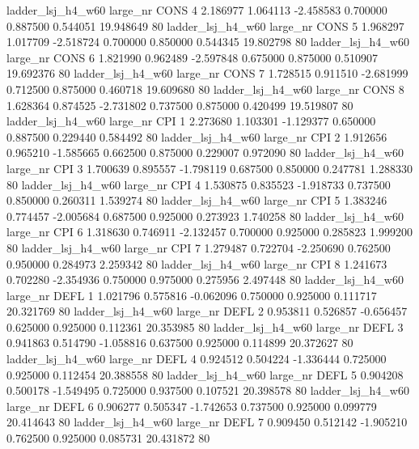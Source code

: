   ladder_lsj_h4_w60   large_nr     CONS                 4  2.186977  1.064113  -2.458583 0.700000 0.887500  0.544051   19.948649 80
  ladder_lsj_h4_w60   large_nr     CONS                 5  1.968297  1.017709  -2.518724 0.700000 0.850000  0.544345   19.802798 80
  ladder_lsj_h4_w60   large_nr     CONS                 6  1.821990  0.962489  -2.597848 0.675000 0.875000  0.510907   19.692376 80
  ladder_lsj_h4_w60   large_nr     CONS                 7  1.728515  0.911510  -2.681999 0.712500 0.875000  0.460718   19.609680 80
  ladder_lsj_h4_w60   large_nr     CONS                 8  1.628364  0.874525  -2.731802 0.737500 0.875000  0.420499   19.519807 80
  ladder_lsj_h4_w60   large_nr      CPI                 1  2.273680  1.103301  -1.129377 0.650000 0.887500  0.229440    0.584492 80
  ladder_lsj_h4_w60   large_nr      CPI                 2  1.912656  0.965210  -1.585665 0.662500 0.875000  0.229007    0.972090 80
  ladder_lsj_h4_w60   large_nr      CPI                 3  1.700639  0.895557  -1.798119 0.687500 0.850000  0.247781    1.288330 80
  ladder_lsj_h4_w60   large_nr      CPI                 4  1.530875  0.835523  -1.918733 0.737500 0.850000  0.260311    1.539274 80
  ladder_lsj_h4_w60   large_nr      CPI                 5  1.383246  0.774457  -2.005684 0.687500 0.925000  0.273923    1.740258 80
  ladder_lsj_h4_w60   large_nr      CPI                 6  1.318630  0.746911  -2.132457 0.700000 0.925000  0.285823    1.999200 80
  ladder_lsj_h4_w60   large_nr      CPI                 7  1.279487  0.722704  -2.250690 0.762500 0.950000  0.284973    2.259342 80
  ladder_lsj_h4_w60   large_nr      CPI                 8  1.241673  0.702280  -2.354936 0.750000 0.975000  0.275956    2.497448 80
  ladder_lsj_h4_w60   large_nr     DEFL                 1  1.021796  0.575816  -0.062096 0.750000 0.925000  0.111717   20.321769 80
  ladder_lsj_h4_w60   large_nr     DEFL                 2  0.953811  0.526857  -0.656457 0.625000 0.925000  0.112361   20.353985 80
  ladder_lsj_h4_w60   large_nr     DEFL                 3  0.941863  0.514790  -1.058816 0.637500 0.925000  0.114899   20.372627 80
  ladder_lsj_h4_w60   large_nr     DEFL                 4  0.924512  0.504224  -1.336444 0.725000 0.925000  0.112454   20.388558 80
  ladder_lsj_h4_w60   large_nr     DEFL                 5  0.904208  0.500178  -1.549495 0.725000 0.937500  0.107521   20.398578 80
  ladder_lsj_h4_w60   large_nr     DEFL                 6  0.906277  0.505347  -1.742653 0.737500 0.925000  0.099779   20.414643 80
  ladder_lsj_h4_w60   large_nr     DEFL                 7  0.909450  0.512142  -1.905210 0.762500 0.925000  0.085731   20.431872 80
